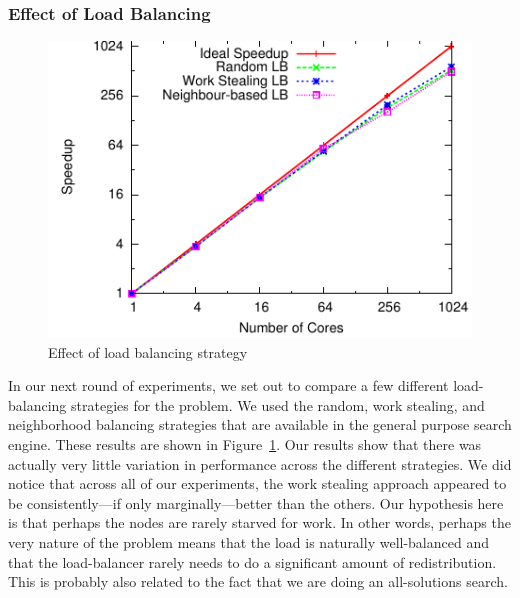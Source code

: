\documentclass[times, 10pt,twocolumn]{article}
\begin{document}
\subsubsection{Effect of Load Balancing}
\begin{figure}[h]
\centering
\includegraphics[width=0.9\columnwidth]{plots/3schemes.pdf}
\vspace{-0.1in}
\caption{Effect of load balancing strategy}
\label{3schemes}
\vspace{-0.2in}
\end{figure}

In our next round of experiments, we set out to compare a few different load-balancing strategies for the problem.  We
used the random, work stealing, and neighborhood balancing strategies that are available in the general purpose search
engine.  These results are shown in Figure~\ref{3schemes}.  Our results show that there was actually very little
variation in performance across the different strategies.  We did notice that across all of our experiments, the work
stealing approach appeared to be consistently---if only marginally---better than the others.  Our hypothesis here is
that perhaps the nodes are rarely starved for work.  In other words, perhaps the very nature of the problem means that
the load is naturally well-balanced and that the load-balancer rarely needs to do a significant amount of
redistribution.  This is probably also related to the fact that we are doing an all-solutions search. 

 
\end{document}
